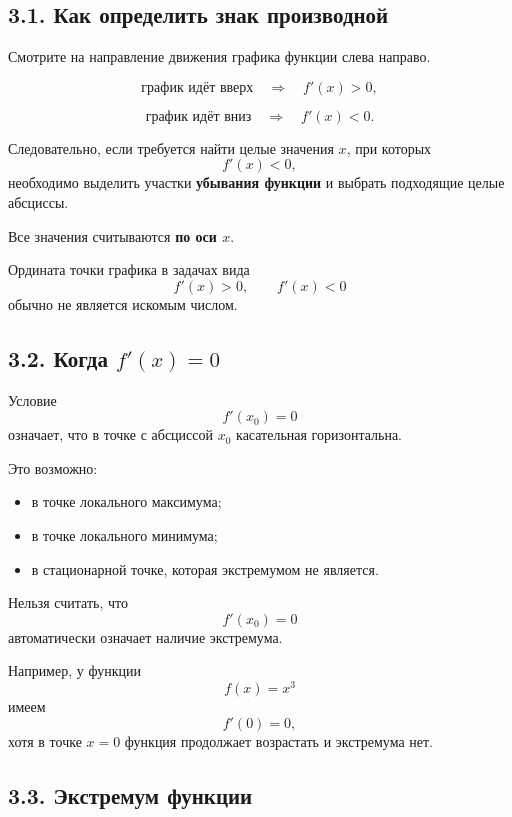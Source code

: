 \documentclass[a4paper,12pt]{article}
\begin{document}
\subsection*{3.1. Как определить знак производной}

Смотрите на направление движения графика функции слева направо.

\[
\boxed{\text{график идёт вверх}}
\quad\Longrightarrow\quad
f'(x)>0,
\]

\[
\boxed{\text{график идёт вниз}}
\quad\Longrightarrow\quad
f'(x)<0.
\]

Следовательно, если требуется найти целые значения \(x\), при которых
\[
f'(x)<0,
\]
необходимо выделить участки \textbf{убывания функции} и выбрать подходящие
целые абсциссы.

\begin{keybox}[Важно]
Все значения считываются \textbf{по оси \(x\)}.

Ордината точки графика в задачах вида
\[
f'(x)>0,\qquad f'(x)<0
\]
обычно не является искомым числом.
\end{keybox}

\subsection*{3.2. Когда \(f'(x)=0\)}

Условие
\[
f'(x_0)=0
\]
означает, что в точке с абсциссой \(x_0\) касательная горизонтальна.

Это возможно:

\begin{itemize}[leftmargin=7mm]
  \item в точке локального максимума;
  \item в точке локального минимума;
  \item в стационарной точке, которая экстремумом не является.
\end{itemize}

\begin{errorbox}
Нельзя считать, что
\[
f'(x_0)=0
\]
автоматически означает наличие экстремума.

Например, у функции
\[
f(x)=x^3
\]
имеем
\[
f'(0)=0,
\]
хотя в точке \(x=0\) функция продолжает возрастать и экстремума нет.
\end{errorbox}

\subsection*{3.3. Экстремум функции}
\end{document}
